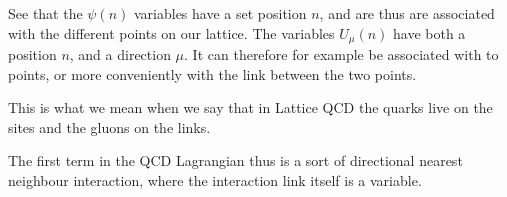 \documentclass[12pt,a4paper,dvipsnames,usenames]{beamer}
\begin{document}
\begin{frame}
\begin{center}
  \end{center}


  \note
  {
    See that the $\psi(n)$ variables have a set position $n$, and are thus are associated with the different points
    on our lattice. The variables $U_{\mu}(n)$ have both a position $n$, and a direction $\mu$. It can therefore for example be
    associated with to points, or more conveniently with the link between the two points.

    \vspace{1em}

    This is what we mean when we say that in Lattice QCD the quarks live on the sites and the gluons on the links.

    \vspace{1em}

    The first term in the QCD Lagrangian thus is a sort of directional nearest neighbour interaction, 
    where the interaction link itself is a variable.
  }
\end{frame}
\end{document}

